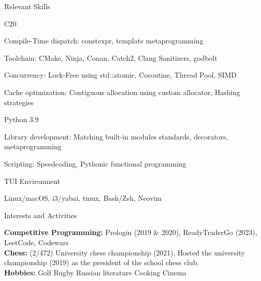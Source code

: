 \documentclass[
	a4paper, %
	10pt, %
]{resume} %
\def\CC{{C\nolinebreak[4]\hspace{-.05em}\raisebox{.4ex}{\tiny\bf ++}}}
\begin{document}
\begin{rSection}{Relevant Skills}
	\begin{rSubsection}{\CC20}{}{}{}
    \item Compile-Time dispatch: constexpr, template metaprogramming
    \item Toolchain: CMake, Ninja, Conan, Catch2, Clang Sanitizers, godbolt
    \item Concurrency: Lock-Free using std::atomic, Coroutine, Thread Pool, SIMD
    \item Cache optimization: Contiguous allocation using custom allocator,  Hashing strategies
	\end{rSubsection}
  \begin{rSubsection}{Python 3.9}{}{}{}
    \item Library development: Matching built-in modules standards, decorators, metaprogramming
    \item Scripting: Speedcoding, Pythonic functional programming
  \end{rSubsection}
  \begin{rSubsection}{TUI Environment}{}{}{}
    \item Linux/macOS, i3/yabai, tmux, Bash/Zsh, Neovim
  \end{rSubsection}
\end{rSection}


\begin{rSection}{Interests and Activities}

	\textbf{Competitive Programming:} Prologin (2019 \& 2020), ReadyTraderGo (2023), LeetCode, Codewars \\
	\textbf{Chess:} (2/472) University chess championship (2021), Hosted the university championship (2019) as the president of the school chess club.\\
  \textbf{Hobbies:} Golf  Rugby  Russian literature  Cooking  Cinema
\end{rSection}
\end{document}
